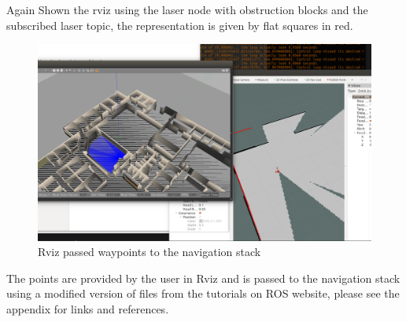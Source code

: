 \documentclass[a4paper, 10pt]{IEEEconf}
\begin{document}
Again Shown the rviz using the laser node with obstruction blocks and the subscribed laser topic, the representation is given by flat squares in red.

\begin{figure}[H]
  \includegraphics[width=0.8\linewidth, center]{images/rvizlaser}
  \caption{Rviz passed waypoints to the navigation stack}
  \label{fig:Rviz passed waypoints to the navigation stack}
\end{figure}

The points are provided by the user in Rviz and is passed to the navigation stack using a modified version of files from the tutorials on ROS website, please see the appendix for links and references.
\end{document}
